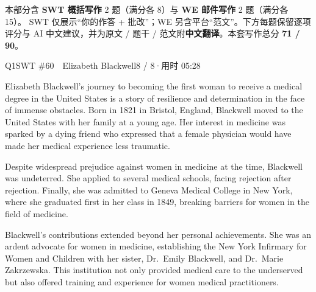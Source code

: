 
\vspace{1mm}
{\small\color{gray} 本部分含 \textbf{SWT 概括写作} 2 题（满分各 8）与 \textbf{WE 邮件写作} 2 题（满分各 15）。
SWT 仅展示“你的作答 + 批改”；WE 另含平台“范文”。下方每题保留逐项评分与 AI 中文建议，并为原文 / 题干 / 范文附\textbf{中文翻译}。本套写作总分 \textbf{71 / 90}。}
\vspace{2mm}


\begin{qblock}{Q1\quad SWT \#60\ \ Elizabeth Blackwell}{8 / 8\quad·\quad 用时 05:28}

\begin{promptbox}
Elizabeth Blackwell's journey to becoming the first woman to receive a medical degree in the United States is a story of resilience and determination in the face of immense obstacles. Born in 1821 in Bristol, England, Blackwell moved to the United States with her family at a young age. Her interest in medicine was sparked by a dying friend who expressed that a female physician would have made her medical experience less traumatic.

Despite widespread prejudice against women in medicine at the time, Blackwell was undeterred. She applied to several medical schools, facing rejection after rejection. Finally, she was admitted to Geneva Medical College in New York, where she graduated first in her class in 1849, breaking barriers for women in the field of medicine.

Blackwell's contributions extended beyond her personal achievements. She was an ardent advocate for women in medicine, establishing the New York Infirmary for Women and Children with her sister, Dr.\ Emily Blackwell, and Dr.\ Marie Zakrzewska. This institution not only provided medical care to the underserved but also offered training and experience for women medical practitioners.
\end{promptbox}


\end{qblock}

